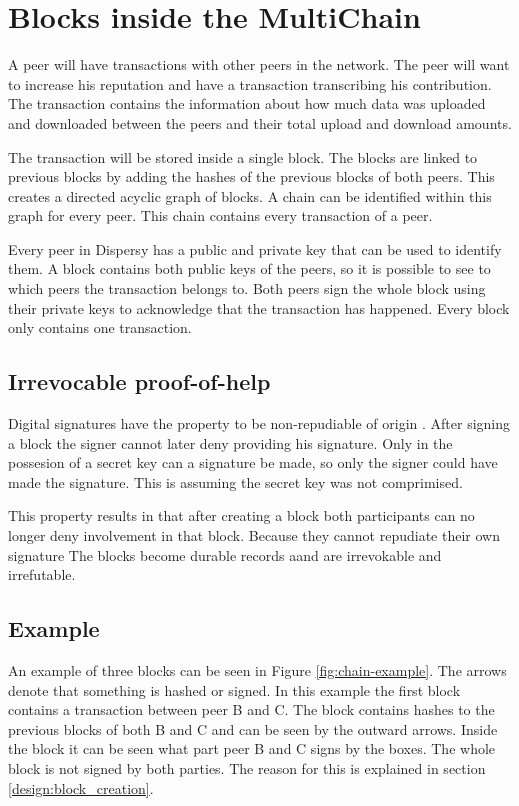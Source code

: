 \section{Blocks inside the MultiChain}
A peer will have transactions with other peers in the network.
The peer will want to increase his reputation and have a transaction transcribing his contribution.
The transaction contains the information about how much data was uploaded and downloaded between the peers
and their total upload and download amounts.

The transaction will be stored inside a single block.
The blocks are linked to previous blocks by adding the hashes of the previous blocks of both peers.
This creates a directed acyclic graph of blocks.
A chain can be identified within this graph for every peer.
This chain contains every transaction of a peer.

Every peer in Dispersy has a public and private key that can be used to identify them.
A block contains both public keys of the peers,
so it is possible to see to which peers the transaction belongs to.
Both peers sign the whole block using their private keys to acknowledge that the transaction has happened.
Every block only contains one transaction.

\subsection{Irrevocable proof-of-help}
Digital signatures have the property to be non-repudiable of origin \cite{VanderLubbe-crypto}.
After signing a block the signer cannot later deny providing his signature.
Only in the possesion of a secret key can a signature be made,
so only the signer could have made the signature.
This is assuming the secret key was not comprimised.

This property results in that after creating a block
both participants can no longer deny involvement in that block.
Because they cannot repudiate their own signature
The blocks become durable records aand are irrevokable and irrefutable.

\subsection{Example}

An example of three blocks can be seen in Figure \ref{fig:chain-example}.
The arrows denote that something is hashed or signed.
In this example the first block contains a transaction between peer B and C.
The block contains hashes to the previous blocks of both B and C
and can be seen by the outward arrows.
Inside the block it can be seen what part peer B and C signs by the boxes.
The whole block is not signed by both parties.
The reason for this is explained in section \ref{design:block_creation}.


